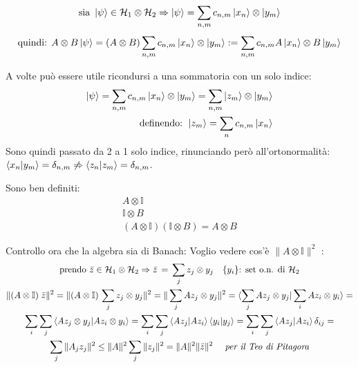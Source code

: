 $$
\mbox{sia } \ket{\psi} \in \mathcal{H}_1 \otimes \mathcal{H}_2 \Rightarrow \ket{\psi} = \sum_{n,m} c_{n,m} \ket{x_n} \otimes \ket{y_m}
$$
\begin{equation} \begin{split}
\mbox{quindi: } A\otimes B \ket{\psi} = (A \otimes B) \sum_{n,m} c_{n,m} \ket{x_n} \otimes \ket{y_m}:=\sum_{n,m} c_{n,m} A \ket{x_n} \otimes B\ket{y_m}
 \end{split} \end{equation}

A volte può essere utile ricondursi a una sommatoria con un solo indice:
\begin{equation} \begin{split}
\ket{\psi}=\sum_{n,m}{c_{n,m}}\ket{x_n} \otimes \ket{y_m} = \sum_{n,m} \ket{z_m} \otimes \ket{y_m}  \\
\mbox{definendo: } \ket{z_m} = \sum_{n} {c_{n,m}} \ket{x_n}
 \end{split} \end{equation}
Sono quindi passato da 2 a 1 solo indice, rinunciando però all'ortonormalità: \\ $\braket{x_n|y_m} = \delta_{n,m} \not\Rightarrow \braket{z_n|z_m} = \delta_{n,m}$.

Sono ben definiti:
\begin{gather}
A\otimes \mathbb{I}\\
\mathbb{I}\otimes B \\
(A\otimes\mathbb{I}) (\mathbb{I}\otimes B)=A\otimes B
\end{gather}

Controllo ora che la algebra sia di Banach:
Voglio vedere cos'è $ \| A \otimes \mathbb{I} \|^{2}$ : 
\begin{gather}
 \mbox{prendo } \bar{z} \in \mathcal{H}_1 \otimes \mathcal{H}_2 \Rightarrow \bar{z}\,=\, \sum_{j} {z_j} \otimes {y_j}  \quad \{ y_i \} \mbox{: set o.n. di } \mathcal{H}_2 \nonumber \\ 
 \|(A\otimes \mathbb{I}) \; \bar{z} \|^2 = \| (A\otimes \mathbb{I}) \,\sum_{j} {z_j} \otimes {y_j} \|^2 =  \| \sum_{j} A {z_j} \otimes {y_j} \|^2 =\braket{\sum_j Az_j \otimes y_j |\sum_i Az_i \otimes y_i}=\nonumber \\
 \sum_i \sum_j \braket{Az_j\otimes {y_j}|Az_i \otimes y_i} = \sum_i \sum_j \braket{Az_j|Az_i} \braket {y_i|y_j} = \sum_i \sum_j \braket{Az_j|Az_i} \delta_{ij} = \nonumber \\
 \sum_{j} \| A_j z_j \|^2 \leq \|A\|^2 \sum_{j} \|z_j\|^2 = \|A\|^2 \|\bar{z}\|^2 \quad \mbox{	\emph{per il Teo di Pitagora}}
\end{gather}

